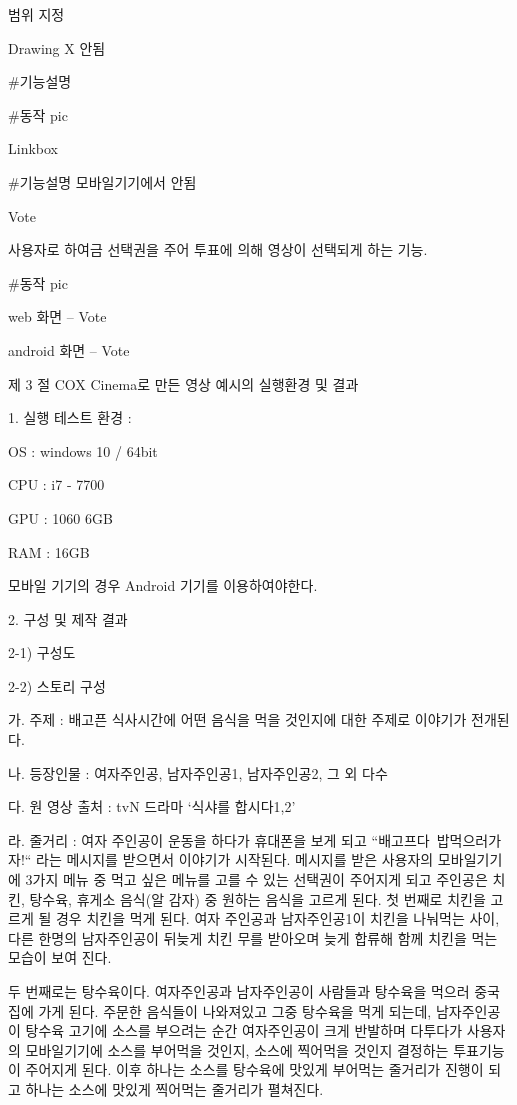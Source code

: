 \documentclass{oblivoir}
\begin{document}
범위 지정

Drawing X 안됨

#기능설명

#동작 pic

Linkbox

#기능설명 모바일기기에서 안됨

Vote

사용자로 하여금 선택권을 주어 투표에 의해 영상이 선택되게 하는 기능.

#동작 pic

web 화면 – Vote

android 화면 – Vote

제  3  절 COX Cinema로 만든 영상 예시의 실행환경 및 결과 

1. 실행 테스트 환경 :

OS : windows 10 / 64bit

CPU : i7 - 7700

GPU : 1060 6GB

RAM : 16GB

모바일 기기의 경우 Android 기기를 이용하여야한다.

  2. 구성 및 제작 결과

2-1) 구성도

  2-2) 스토리 구성

가. 주제 : 배고픈 식사시간에 어떤 음식을 먹을 것인지에 대한 주제로 이야기가 전개된다.  

나. 등장인물 : 여자주인공, 남자주인공1, 남자주인공2, 그 외 다수

다. 원 영상 출처 : tvN 드라마 ‘식샤를 합시다1,2’ 

라. 줄거리 : 여자 주인공이 운동을 하다가 휴대폰을 보게 되고 “배고프다~밥먹으러가자!“ 라는 메시지를 받으면서 이야기가 시작된다. 메시지를 받은 사용자의 모바일기기에 3가지 메뉴 중 먹고 싶은 메뉴를 고를 수 있는 선택권이 주어지게 되고 주인공은 치킨, 탕수육, 휴게소 음식(알 감자) 중 원하는 음식을 고르게 된다. 첫 번째로 치킨을 고르게 될 경우 치킨을 먹게 된다. 여자 주인공과 남자주인공1이 치킨을 나눠먹는 사이, 다른 한명의 남자주인공이 뒤늦게 치킨 무를 받아오며 늦게 합류해 함께 치킨을 먹는 모습이 보여 진다. 

두 번째로는 탕수육이다. 여자주인공과 남자주인공이 사람들과 탕수육을 먹으러 중국집에 가게 된다. 주문한 음식들이 나와져있고 그중 탕수육을 먹게 되는데, 남자주인공이 탕수육 고기에 소스를 부으려는 순간 여자주인공이 크게 반발하며 다투다가 사용자의 모바일기기에 소스를 부어먹을 것인지, 소스에 찍어먹을 것인지 결정하는 투표기능이 주어지게 된다. 이후 하나는 소스를 탕수육에 맛있게 부어먹는 줄거리가 진행이 되고 하나는 소스에 맛있게 찍어먹는 줄거리가 펼쳐진다. 
\end{document}
